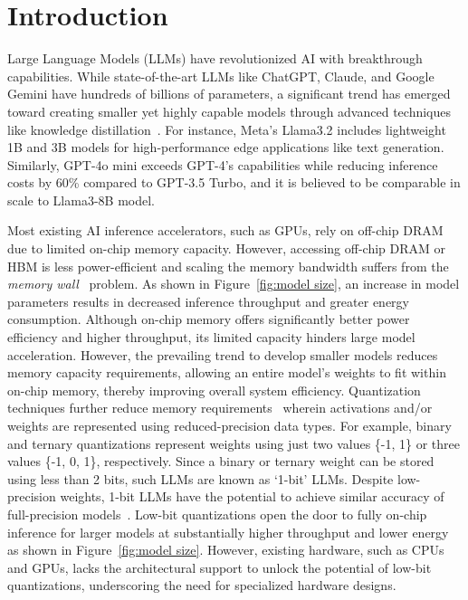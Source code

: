 \vspace{-2mm}
\section{Introduction}
\label{sec:intro}
Large Language Models (LLMs) have revolutionized AI with breakthrough capabilities. While state-of-the-art LLMs like ChatGPT\cite{chatgpt}, Claude\cite{claude}, and Google Gemini\cite{gemini} have hundreds of billions of parameters, a significant trend has emerged toward creating smaller yet highly capable models through advanced techniques like knowledge distillation~\cite{kd}. For instance, Meta's Llama3.2\cite{llama3.2} includes lightweight 1B and 3B models for high-performance edge applications like text generation. Similarly, GPT-4o mini\cite{gpt4omini} exceeds GPT-4's capabilities while reducing inference costs by 60\% compared to GPT-3.5 Turbo, and it is believed to be comparable in scale to Llama3-8B model\cite{gpt4omini_1}.

Most existing AI inference accelerators, such as GPUs, rely on off-chip DRAM due to limited on-chip memory capacity. However, accessing off-chip DRAM or HBM is less power-efficient and scaling the memory bandwidth suffers from the \textit{memory wall}~\cite{memory_wall} problem. As shown in Figure~\ref{fig:model size}, an increase in model parameters results in decreased inference throughput and greater energy consumption. Although on-chip memory offers significantly better power efficiency and higher throughput, its limited capacity hinders large model acceleration. However, the prevailing trend to develop smaller models reduces memory capacity requirements, allowing an entire model's weights to fit within on-chip memory, thereby improving overall system efficiency. Quantization techniques further reduce memory requirements~\cite{awq,quip,10705489,i-llm,binarybert,bitnet,bitnet1.58} wherein activations and/or weights are represented using reduced-precision data types. For example, binary and ternary quantizations represent weights using just two values \{-1, 1\} or three values \{-1, 0, 1\}, respectively.
Since a binary or ternary weight can be stored using less than 2 bits, such LLMs are known as `1-bit' LLMs. Despite low-precision weights, 1-bit LLMs have the potential to achieve similar accuracy of full-precision models~\cite{bitnet,bitnet1.58,scalable,vit1.58,1bittheory}. Low-bit quantizations open the door to fully on-chip inference for larger models at substantially higher throughput and lower energy as shown in Figure~\ref{fig:model size}. However, existing hardware, such as CPUs and GPUs, lacks the architectural support to unlock the potential of low-bit quantizations, underscoring the need for specialized hardware designs.

